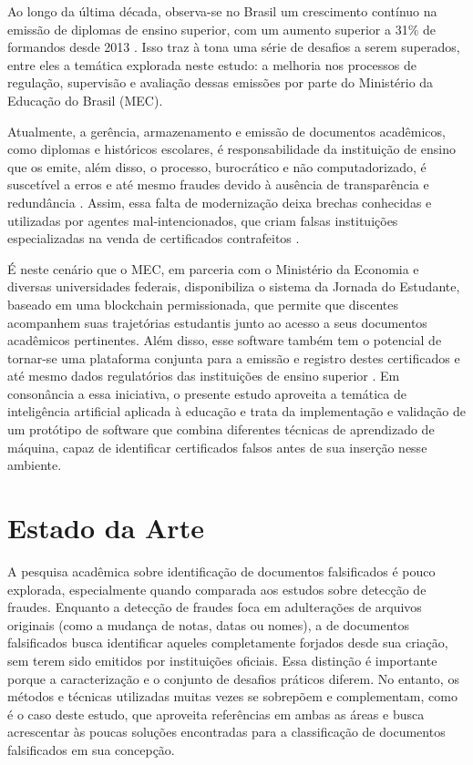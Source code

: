 \documentclass[12pt]{article}
\begin{document}
Ao longo da última década, observa-se no Brasil um crescimento contínuo na emissão de diplomas de ensino superior, com um aumento superior a 31\% de formandos desde 2013 \cite{inep:2023}. Isso traz à tona uma série de desafios a serem superados, entre eles a temática explorada neste estudo: a melhoria nos processos de regulação, supervisão e avaliação dessas emissões por parte do Ministério da Educação do Brasil (MEC).

Atualmente, a gerência, armazenamento e emissão de documentos acadêmicos, como diplomas e históricos escolares, é responsabilidade da instituição de ensino que os emite, além disso, o processo, burocrático e não computadorizado, é suscetível a erros e até mesmo fraudes devido à ausência de transparência e redundância \cite{palma:2019}. Assim, essa falta de modernização deixa brechas conhecidas e utilizadas por agentes mal-intencionados, que criam falsas instituições especializadas na venda de certificados contrafeitos \cite{dias:2022}.

É neste cenário que o MEC, em parceria com o Ministério da Economia e diversas universidades federais, disponibiliza o sistema da Jornada do Estudante, baseado em uma blockchain permissionada, que permite que discentes acompanhem suas trajetórias estudantis junto ao acesso a seus documentos acadêmicos pertinentes. Além disso, esse software também tem o potencial de tornar-se uma plataforma conjunta para a emissão e registro destes certificados e até mesmo dados regulatórios das instituições de ensino superior \cite{rnp:2023}. Em consonância a essa iniciativa, o presente estudo aproveita a temática de inteligência artificial aplicada à educação e trata da implementação e validação de um protótipo de software que combina diferentes técnicas de aprendizado de máquina, capaz de identificar certificados falsos antes de sua inserção nesse ambiente.

\section{Estado da Arte}

A pesquisa acadêmica sobre identificação de documentos falsificados é pouco explorada, especialmente quando comparada aos estudos sobre detecção de fraudes. Enquanto a detecção de fraudes foca em adulterações de arquivos originais (como a mudança de notas, datas ou nomes), a de documentos falsificados busca identificar aqueles completamente forjados desde sua criação, sem terem sido emitidos por instituições oficiais. Essa distinção é importante porque a caracterização e o conjunto de desafios práticos diferem. No entanto, os métodos e técnicas utilizadas muitas vezes se sobrepõem e complementam, como é o caso deste estudo, que aproveita referências em ambas as áreas e busca acrescentar às poucas soluções encontradas para a classificação de documentos falsificados em sua concepção.
\end{document}
